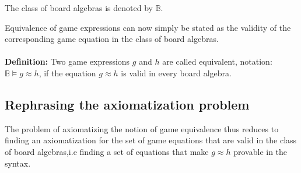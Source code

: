 \documentclass[12pt]{article}
\begin{document}
The class of board algebras is denoted by $\mathbb{B}$.

Equivalence of game expressions can now simply be stated as the validity of the corresponding game equation in the class of board algebras. \\ \\
\textbf{Definition:} Two game expressions $g$ and $h$ are called equivalent, notation: $\mathbb{B}\vDash g \approx h$, if the equation $g \approx h$ is valid in every board algebra.  
\subsection{Rephrasing the axiomatization problem}
The problem of axiomatizing the notion of game equivalence thus reduces to finding an axiomatization for the set of game equations that are valid in the class of board algebras,i.e finding a set of equations that make $g \approx h$ provable in the syntax. 
\end{document}
